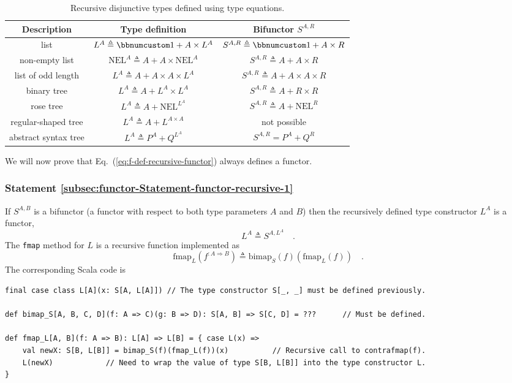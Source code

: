 \begin{table}
\begin{centering}
\begin{tabular}{|c|c|c|}
\hline 
\textbf{\small{}Description} & \textbf{\small{}Type definition} & \textbf{\small{}Bifunctor $S^{A,R}$}\tabularnewline
\hline 
\hline 
{\small{}list} & {\small{}$L^{A}\triangleq\bbnum 1+A\times L^{A}$} & {\small{}$S^{A,R}\triangleq\bbnum 1+A\times R$}\tabularnewline
\hline 
{\small{}non-empty list} & {\small{}$\text{NEL}^{A}\triangleq A+A\times\text{NEL}^{A}$} & {\small{}$S^{A,R}\triangleq A+A\times R$}\tabularnewline
\hline 
{\small{}list of odd length} & {\small{}$L^{A}\triangleq A+A\times A\times L^{A}$} & {\small{}$S^{A,R}\triangleq A+A\times A\times R$}\tabularnewline
\hline 
{\small{}binary tree} & {\small{}$L^{A}\triangleq A+L^{A}\times L^{A}$} & {\small{}$S^{A,R}\triangleq A+R\times R$}\tabularnewline
\hline 
{\small{}rose tree} & {\small{}$L^{A}\triangleq A+\text{NEL}^{L^{A}}$} & {\small{}$S^{A,R}\triangleq A+\text{NEL}^{R}$}\tabularnewline
\hline 
{\small{}regular-shaped tree} & {\small{}$L^{A}\triangleq A+L^{A\times A}$} & {\small{}not possible}\tabularnewline
\hline 
{\small{}abstract syntax tree} & {\small{}$L^{A}\triangleq P^{A}+Q^{L^{A}}$} & {\small{}$S^{A,R}=P^{A}+Q^{R}$}\tabularnewline
\hline 
\end{tabular}
\par\end{centering}
\caption{Recursive disjunctive types defined using type equations.\label{tab:Examples-of-recursive-disjunctive-type-equations}}
\end{table}

We will now prove that Eq.~(\ref{eq:f-def-recursive-functor}) always
defines a functor.

\subsubsection{Statement \label{subsec:functor-Statement-functor-recursive-1}\ref{subsec:functor-Statement-functor-recursive-1}}

If $S^{A,B}$ is a bifunctor (a functor with respect to both type
parameters $A$ and $B$) then the recursively defined type constructor
$L^{A}$ is a functor,
\[
L^{A}\triangleq S^{A,L^{A}}\quad.
\]
The \lstinline!fmap! method for $L$ is a recursive function implemented
as
\[
\text{fmap}_{L}(f^{:A\Rightarrow B})\triangleq\text{bimap}_{S}(f)(\text{fmap}_{L}(f))\quad.
\]
The corresponding Scala code is
\begin{lstlisting}
final case class L[A](x: S[A, L[A]]) // The type constructor S[_, _] must be defined previously.

def bimap_S[A, B, C, D](f: A => C)(g: B => D): S[A, B] => S[C, D] = ???      // Must be defined.

def fmap_L[A, B](f: A => B): L[A] => L[B] = { case L(x) =>
    val newX: S[B, L[B]] = bimap_S(f)(fmap_L(f))(x)          // Recursive call to contrafmap(f).
    L(newX)            // Need to wrap the value of type S[B, L[B]] into the type constructor L.
}
\end{lstlisting}


